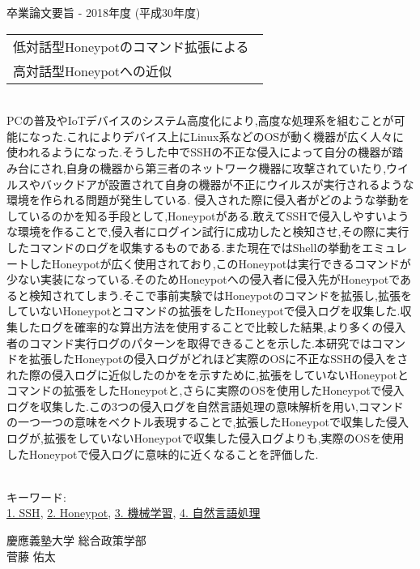 卒業論文要旨 - 2018年度 (平成30年度)
\begin{center}
\begin{large}
\begin{tabular}{|M{0.97\linewidth}|}
    \hline
   低対話型Honeypotのコマンド拡張による\\高対話型Honeypotへの近似\\
    \hline
\end{tabular}
\end{large}
\end{center}

~ \\

PCの普及やIoTデバイスのシステム高度化により,高度な処理系を組むことが可能になった.これによりデバイス上にLinux系などのOSが動く機器が広く人々に使われるようになった.そうした中でSSHの不正な侵入によって自分の機器が踏み台にされ,自身の機器から第三者のネットワーク機器に攻撃されていたり,ウイルスやバックドアが設置されて自身の機器が不正にウイルスが実行されるような環境を作られる問題が発生している.
侵入された際に侵入者がどのような挙動をしているのかを知る手段として,Honeypotがある.敢えてSSHで侵入しやすいような環境を作ることで,侵入者にログイン試行に成功したと検知させ,その際に実行したコマンドのログを収集するものである.また現在ではShellの挙動をエミュレートしたHoneypotが広く使用されており,このHoneypotは実行できるコマンドが少ない実装になっている.そのためHoneypotへの侵入者に侵入先がHoneypotであると検知されてしまう.そこで事前実験ではHoneypotのコマンドを拡張し,拡張をしていないHoneypotとコマンドの拡張をしたHoneypotで侵入ログを収集した.収集したログを確率的な算出方法を使用することで比較した結果,より多くの侵入者のコマンド実行ログのパターンを取得できることを示した.本研究ではコマンドを拡張したHoneypotの侵入ログがどれほど実際のOSに不正なSSHの侵入をされた際の侵入ログに近似したのかをを示すために,拡張をしていないHoneypotとコマンドの拡張をしたHoneypotと,さらに実際のOSを使用したHoneypotで侵入ログを収集した.この3つの侵入ログを自然言語処理の意味解析を用い,コマンドの一つ一つの意味をベクトル表現することで,拡張したHoneypotで収集した侵入ログが,拡張をしていないHoneypotで収集した侵入ログよりも,実際のOSを使用したHoneypotで侵入ログに意味的に近くなることを評価した.


~ \\
キーワード:\\
\underline{1. SSH},
\underline{2. Honeypot},
\underline{3. 機械学習},
\underline{4. 自然言語処理}
\begin{flushright}
慶應義塾大学 総合政策学部\\
菅藤 佑太
\end{flushright}
